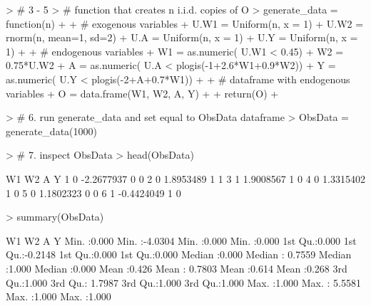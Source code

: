 \documentclass[answers]{exam}
\begin{document}
\begin{solution}

\begin{Schunk}
\end{Schunk}
\begin{Schunk}
\end{Schunk}
\begin{Schunk}
\begin{Sinput}
> # 3 - 5
> # function that creates n i.i.d. copies of O
> generate_data = function(n) {
+   
+   # exogenous variables
+   U.W1 = Uniform(n, x = 1)
+   U.W2 = rnorm(n, mean=1, sd=2)
+   U.A = Uniform(n, x = 1)
+   U.Y = Uniform(n, x = 1)
+   
+   # endogenous variables 
+   W1 = as.numeric( U.W1 < 0.45)
+   W2 = 0.75*U.W2
+   A = as.numeric( U.A < plogis(-1+2.6*W1+0.9*W2))
+   Y = as.numeric( U.Y < plogis(-2+A+0.7*W1))
+   
+   # dataframe with endogenous variables
+   O = data.frame(W1, W2, A, Y)
+     
+   return(O)
+ }
\end{Sinput}
\end{Schunk}
\begin{Schunk}
\begin{Sinput}
> # 6. run generate_data and set equal to ObsData dataframe
> ObsData = generate_data(1000)
\end{Sinput}
\end{Schunk}
\begin{Schunk}
\begin{Sinput}
> # 7. inspect ObsData
> head(ObsData)
\end{Sinput}
\begin{Soutput}
  W1         W2 A Y
1  0 -2.2677937 0 0
2  0  1.8953489 1 1
3  1  1.9008567 1 0
4  0  1.3315402 1 0
5  0  1.1802323 0 0
6  1 -0.4424049 1 0
\end{Soutput}
\begin{Sinput}
> summary(ObsData)
\end{Sinput}
\begin{Soutput}
       W1              W2                A               Y        
 Min.   :0.000   Min.   :-4.0304   Min.   :0.000   Min.   :0.000  
 1st Qu.:0.000   1st Qu.:-0.2148   1st Qu.:0.000   1st Qu.:0.000  
 Median :0.000   Median : 0.7559   Median :1.000   Median :0.000  
 Mean   :0.426   Mean   : 0.7803   Mean   :0.614   Mean   :0.268  
 3rd Qu.:1.000   3rd Qu.: 1.7987   3rd Qu.:1.000   3rd Qu.:1.000  
 Max.   :1.000   Max.   : 5.5581   Max.   :1.000   Max.   :1.000  
\end{Soutput}
\end{Schunk}



\end{solution}
\end{document}
